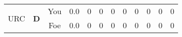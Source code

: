 \documentclass[a4paper,12pt]{article}
\begin{document}
\begin{tabular}[t]{| c | c | c | c | c | c | c | c | c | c | c | c
      |}
                      
      
                      
      
        \hline
        \multirow{2}{*}{  URC
             } &
              \multirow{2}{*}{  
                  \textbf{D}  } & 
                    \cellcolor{yellow!25} You & \cellcolor{yellow!25} 0.0 & \cellcolor{yellow!25} 0 &
                    \cellcolor{yellow!25} 0 & \cellcolor{yellow!25} 0 & \cellcolor{yellow!25} 0 &
                    \cellcolor{yellow!25} 0 & \cellcolor{yellow!25} 0 & \cellcolor{yellow!25} 0 &
                    \cellcolor{yellow!25} 0 \\
                    \cline{3-12}
                    & & \cellcolor{red!15} Foe & \cellcolor{red!15} 0.0 & \cellcolor{red!15} 0 & \cellcolor{red!15}
                    0 & \cellcolor{red!15} 0
                    & \cellcolor{red!15} 0 & \cellcolor{red!15}
                    0 & \cellcolor{red!15} 0 
                    & \cellcolor{red!15} 0 & \cellcolor{red!15}
                    0 \\
                    
                      
      
                      
                        \hline
                      \end{tabular}
                      
\end{document}
